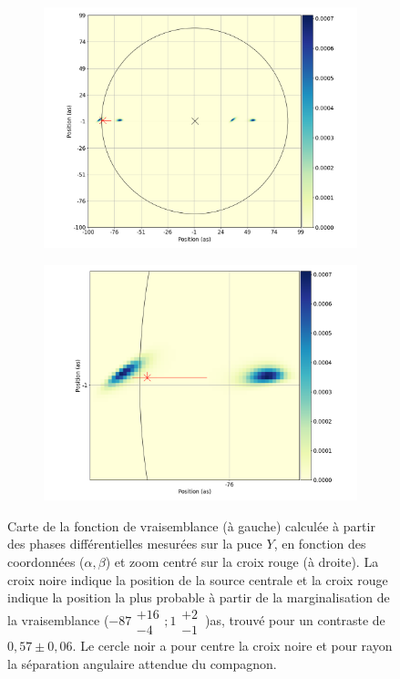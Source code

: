 \begin{figure}[ht!]
    \centering
    \begin{subfigure}{0.5\textwidth}
        \centering
        \includegraphics[width=\textwidth]{Figure_Chap4/20221010_Bin02_SpeDiffPhase_FitLikeli_Map_Pola1_LaTex.png}
    \end{subfigure}%
    \begin{subfigure}{0.5\textwidth}
        \centering
        \includegraphics[width=\textwidth]{Figure_Chap4/20221010_Bin02_SpeDiffPhase_FitLikeli_MapZoom_Pola1_LaTex.png}
    \end{subfigure}
    \caption[Carte de la fonction de vraisemblance calculée à partir des phases différentielles mesurées sur la puce $Y$.]{Carte de la fonction de vraisemblance (à gauche) calculée à partir des phases différentielles mesurées sur la puce $Y$, en fonction des coordonnées ($\alpha, \beta$) et zoom centré sur la croix rouge (à droite). La croix noire indique la position de la source centrale et la croix rouge indique la position la plus probable à partir de la marginalisation de la vraisemblance ($-87\substack{+16 \\ -4}; 1\substack{+2 \\ -1} \,$)as, trouvé pour un contraste de $0,57 \pm 0,06$. Le cercle noir a pour centre la croix noire et pour rayon la séparation angulaire attendue du compagnon.}

\end{figure}

